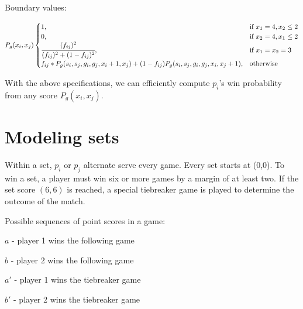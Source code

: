 \documentclass[chapterprefix=false]{report}
\begin{document}
Boundary values:

\begin{equation}
    P_g(x_i,x_j) 
    \begin{cases}
      1, & \text{if}\ x_1=4,x_2 \leq 2 \\
      0, & \text{if}\ x_2=4,x_1 \leq 2 \\
      \cfrac{(f_{ij})^2}{(f_{ij})^2+(1-f_{ij})^2}, & \text{if}\ x_1=x_2=3 \\
      f_{ij}*P_g(s_i,s_j,g_i,g_j,{x}_i+1,{x}_j) + (1-f_{ij}) P_g(s_i,s_j,g_i,g_j,{x}_i,{x}_j+1), & \text{otherwise}\ \\
      
    \end{cases}
  \end{equation}

With the above specifications, we can efficiently compute $p_i$'s win probability from any score $P_g(x_i,x_j)$.

\section{Modeling sets}

Within a set, $p_i$ or $p_j$ alternate serve every game. Every set starts at (0,0). To win a set, a player must win six or more games by a margin of at least two. If the set score $(6,6)$ is reached, a special tiebreaker game is played to determine the outcome of the match.

Possible sequences of point scores in a game:

$a$ - player 1 wins the following game

$b$ - player 2 wins the following game

$a'$ - player 1 wins the tiebreaker game

$b'$ - player 2 wins the tiebreaker game
\end{document}
